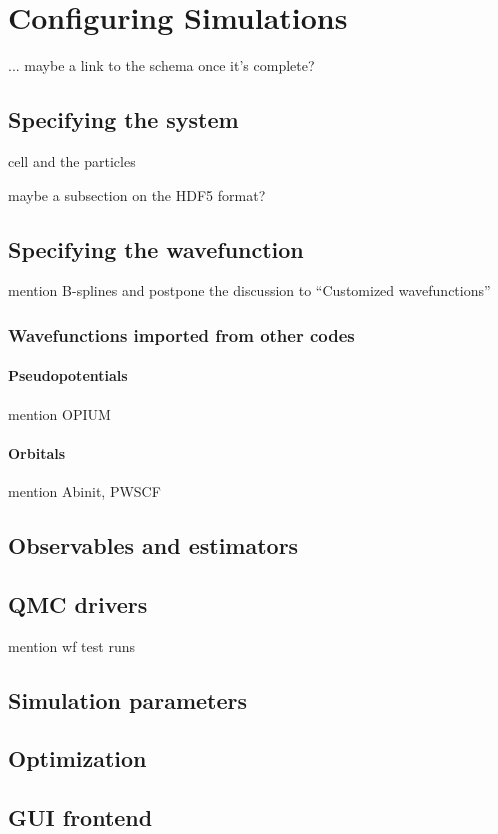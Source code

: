 \chapter{Configuring Simulations}
... maybe a link to the schema once it's complete?
\section{Specifying the system}
cell and the particles

maybe a subsection on the HDF5 format?
\section{Specifying the wavefunction}
mention B-splines and postpone the discussion to ``Customized wavefunctions''
\subsection{Wavefunctions imported from other codes}
\subsubsection{Pseudopotentials}
mention OPIUM
\subsubsection{Orbitals}
mention Abinit, PWSCF
\section{Observables and estimators}
\section{QMC drivers}
mention wf test runs
\section{Simulation parameters}
\section{Optimization}
\section{GUI frontend}

